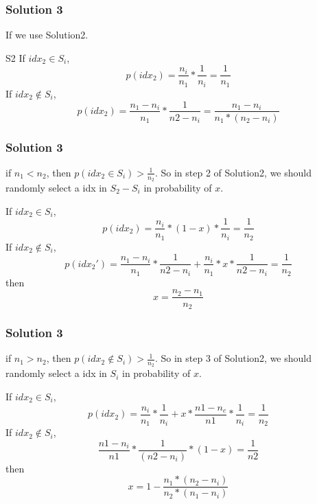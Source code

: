 \documentclass[notheorems, aspectratio=54]{beamer}
\begin{document}
\begin{frame}
    \frametitle{Solution 3}
    If we use Solution2.
    \begin{block}{S2}
        If $idx_2 \in S_i$, 
        $$
            p(idx_2) = \frac{n_i}{n_1}*\frac{1}{n_i} = \frac{1}{n_1}
        $$
        If $idx_2 \notin S_i$, 
        $$
            p(idx_2) = \frac{n_1-n_i}{n_1}*\frac{1}{n2-n_i} = \frac{n_1-n_i}{n_1*(n_2-n_i)}
        $$
    \end{block}
\end{frame}

\begin{frame}
    \frametitle{Solution 3}
        if $n_1 < n_2$, then $p(idx_2 \in S_i) > \frac{1}{n_2}$. So in step 2 of Solution2, we should randomly select a idx in $S_2-S_i$ in probability of $x$.\\
        \begin{block}
        If $idx_2 \in S_i$, 
        $$
            p(idx_2) = \frac{n_i}{n_1}*(1-x)*\frac{1}{n_i} = \frac{1}{n_2}
        $$
        If $idx_2 \notin S_i$, 
        $$
            p(idx_2') = \frac{n_1-n_i}{n_1}*\frac{1}{n2-n_i} + \frac{n_i}{n_1}*x*\frac{1}{n2-n_i} = \frac{1}{n_2}
        $$
        then
        $$
            x = \frac{n_2-n_1}{n_2}
        $$
    \end{block}
\end{frame}

\begin{frame}
    \frametitle{Solution 3}
        if $n_1 > n_2$, then $p(idx_2 \notin S_i) > \frac{1}{n_2}$. So in step 3 of Solution2, we should randomly select a idx in $S_i$ in probability of $x$.\\
        \begin{block}
        If $idx_2 \in S_i$, 
        $$
            p(idx_2) = \frac{n_i}{n_1}*\frac{1}{n_i}+x*\frac{n1-n_c}{n1}*\frac{1}{n_i} = \frac{1}{n_2}
        $$
        If $idx_2 \notin S_i$, 
        $$
        \frac{n1-n_i}{n1}*\frac{1}{(n2-n_i)}*(1-x) = \frac{1}{n2}
        $$
        then
        $$
            x = 1-\frac{n_1*(n_2-n_i)}{n_2*(n_1-n_i)}
        $$
    \end{block}
\end{frame}
\end{document}
